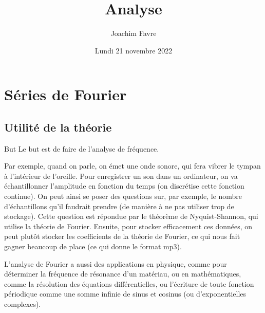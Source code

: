 \documentclass[a4paper]{article}
\title{Analyse}
\author{Joachim Favre}
\date{Lundi 21 novembre 2022}
\begin{document}
\maketitle


\section{Séries de Fourier}
\subsection{Utilité de la théorie}

\begin{parag}{But}
    Le but est de faire de l'analyse de fréquence.

    Par exemple, quand on parle, on émet une onde sonore, qui fera vibrer le tympan à l'intérieur de l'oreille. Pour enregistrer un son dans un ordinateur, on va échantillonner l'amplitude en fonction du temps (on discrétise cette fonction continue). On peut ainsi se poser des questions sur, par exemple, le nombre d'échantillons qu'il faudrait prendre (de manière à ne pas utiliser trop de stockage). Cette question est répondue par le théorème de Nyquist-Shannon, qui utilise la théorie de Fourier. Ensuite, pour stocker efficacement ces données, on peut plutôt stocker les coefficients de la théorie de Fourier, ce qui nous fait gagner beaucoup de place (ce qui donne le format mp3).

    L'analyse de Fourier a aussi des applications en physique, comme pour déterminer la fréquence de résonance d'un matériau, ou en mathématiques, comme la résolution des équations différentielles, ou l'écriture de toute fonction périodique comme une somme infinie de sinus et cosinus (ou d'exponentielles complexes).
\end{parag}
\end{document}
